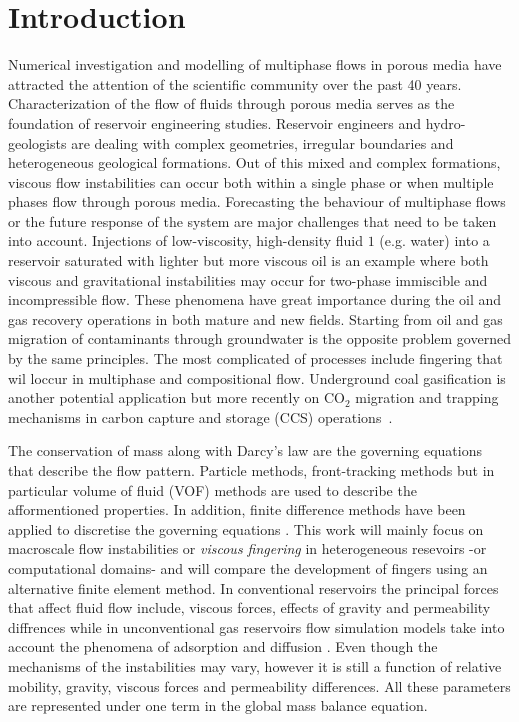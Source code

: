 \documentclass[preprint,authoryear,12pt]{elsarticle}
\begin{document}

\clearpage

\section{Introduction}\label{section:Intro}
\medskip
Numerical investigation and modelling of multiphase flows in porous media have attracted the attention of the scientific community over the past 40 years. Characterization of the flow of fluids through porous media serves as the foundation of reservoir engineering studies. Reservoir engineers and hydro-geologists are dealing with complex geometries, irregular boundaries and heterogeneous geological formations. Out of this mixed and complex formations, viscous flow instabilities can occur both within a single phase or when multiple phases flow through porous media. Forecasting the behaviour of multiphase flows or the future response of the system are major challenges that need to be taken into account. Injections of low-viscosity, high-density fluid $1$ (e.g. water) into a reservoir saturated with lighter but more viscous oil is an example where both viscous and gravitational instabilities may occur for two-phase immiscible and incompressible flow. These phenomena have great importance during the oil and gas recovery operations in both mature and new fields. Starting from oil and gas migration of contaminants through groundwater is the opposite problem governed by the same principles. The most complicated of processes include fingering that wil loccur in multiphase and compositional flow. Underground coal gasification is another potential application but more recently on CO$_{\text{2}}$ migration and trapping mechanisms in carbon capture and storage (CCS) operations~\citep{spycher_2003, chen_2006, self_2012, pruess_1990c, white_1981,jiang_2011}.

\medskip
The conservation of mass along with Darcy's law are the governing equations that describe the flow pattern. Particle methods, front-tracking methods \citep{univerdi_1992} but in particular volume of fluid (VOF) methods \citep{hirt_1981,rider_1998} are used to describe the afformentioned properties. In addition, finite difference methods have been applied to discretise the governing equations \citep{Luo2016,Moortgat2016,Hoteit2008}. This work will mainly focus on macroscale flow instabilities or \textit{viscous fingering} in heterogeneous resevoirs -or computational domains- and will compare the development of fingers using an alternative finite element method. 
In conventional reservoirs the principal forces that affect fluid flow include, viscous forces, effects of gravity and permeability diffrences while in unconventional gas reservoirs flow simulation models take into account the phenomena of adsorption and diffusion \citep{abdus_2015}. Even though the mechanisms of the instabilities may vary, however it is still a function of relative mobility, gravity, viscous forces and permeability differences. All these parameters are represented under one term in the global mass balance equation.   
\end{document}

